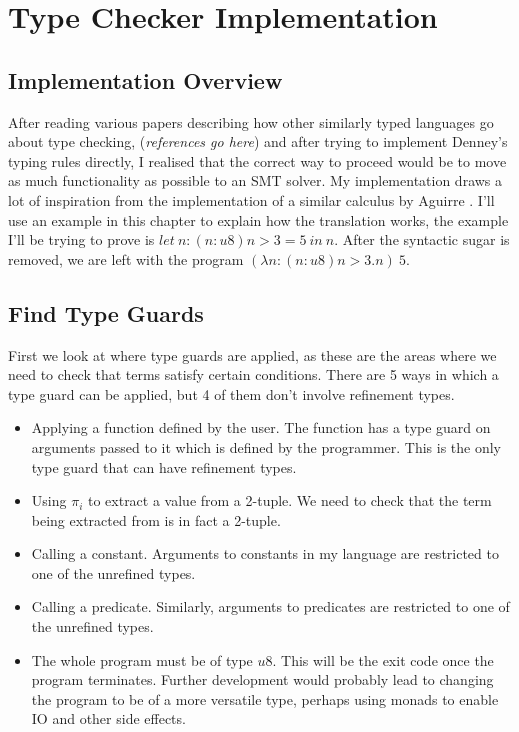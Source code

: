\section{Type Checker Implementation}

\subsection{Implementation Overview}

After reading various papers describing how other similarly typed languages go about type checking,
(\textit{references go here})
and after trying to implement Denney's typing rules directly, I realised that the correct way to
proceed would be to move as much functionality as possible to an SMT solver.
My implementation draws a lot of inspiration from the implementation of a similar calculus by
Aguirre \cite{aguirre16}.
I'll use an example in this chapter to explain how the translation works, the example I'll be
trying to prove is $let\ n: (n:u8) n > 3 = 5\ in\ n$.
After the syntactic sugar is removed, we are left with the program
$(\lambda n: (n:u8) n > 3 . n)\ 5$.

\subsection{Find Type Guards}

First we look at where type guards are applied, as these are the areas where we need to check
that terms satisfy certain conditions.
There are 5 ways in which a type guard can be applied, but 4 of them don't involve refinement types.

\begin{itemize}
    \item Applying a function defined by the user.
    The function has a type guard on arguments passed to it which is defined by the programmer.
    This is the only type guard that can have refinement types.
    \item Using $\pi_i$ to extract a value from a 2-tuple.
    We need to check that the term being extracted from is in fact a 2-tuple.
    \item Calling a constant.
    Arguments to constants in my language are restricted to one of the unrefined types.
    \item Calling a predicate.
    Similarly, arguments to predicates are restricted to one of the unrefined types.
    \item The whole program must be of type $u8$.
    This will be the exit code once the program terminates.
    Further development would probably lead to changing the program to be of a more versatile type,
    perhaps using monads to enable IO and other side effects.
\end{itemize}


